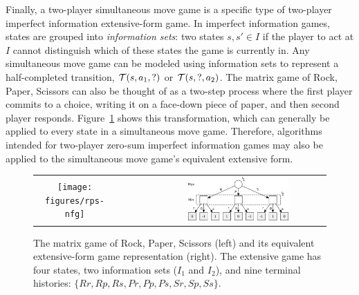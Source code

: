 Finally, a two-player simultaneous move game is a specific type of two-player imperfect information extensive-form game.
In imperfect information
games, states are grouped into {\it information sets}: two states $s, s' \in I$ if the player
to act at $I$ cannot distinguish which of these states the game is currently in. Any simultaneous move game can be modeled
using information sets to represent a half-completed transition, \ie $\mathcal{T}(s, a_1, ?)$ or $\mathcal{T}(s, ?, a_2)$.
The matrix game of Rock, Paper, Scissors can also be thought of as a two-step process where the first player commits
to a choice, writing it on a face-down piece of paper, and then second player responds. Figure~\ref{fig:rps-equiv} shows this
transformation, which can generally be applied to every state in a simultaneous move game.
Therefore, algorithms intended for two-player zero-sum imperfect information games may also be applied to the
simultaneous move game's equivalent extensive form.

\begin{figure}
\begin{center}
\begin{tabular}{ccc}
\texttt{[image: figures/rps-nfg]} & ~~~~~ & \includegraphics[width=0.6\textwidth]{figures/rps-new} \\
\end{tabular}
\end{center}
\caption{The matrix game of Rock, Paper, Scissors (left) and its equivalent extensive-form game representation (right). The extensive
game has four states, two information sets ($I_1$ and $I_2$),
and nine terminal histories: $\{ Rr, Rp, Rs, Pr, Pp, Ps, Sr, Sp, Ss \}$. \label{fig:rps-equiv}}
\end{figure}



